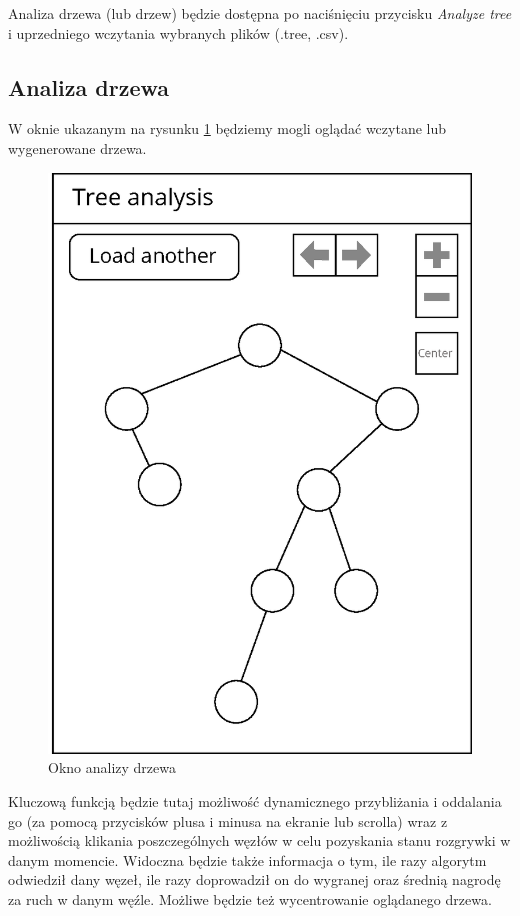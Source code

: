 \documentclass{article}
\begin{document}
	\noindent Analiza drzewa (lub drzew) będzie dostępna po naciśnięciu przycisku \textit{Analyze tree} i uprzedniego wczytania wybranych plików (.tree, .csv).
	
	\clearpage
	\subsection{Analiza drzewa}
	W oknie ukazanym na rysunku \ref{rys:analyze_tree} będziemy mogli oglądać wczytane lub wygenerowane drzewa. 
	\begin{figure}[h!]
		\centering
		\includegraphics[scale=0.8]{tree-eps-improved}
		\caption{Okno analizy drzewa}
		\label{rys:analyze_tree}
	\end{figure}
	
	\noindent Kluczową funkcją będzie tutaj możliwość dynamicznego przybliżania i oddalania go (za pomocą przycisków plusa i minusa na ekranie lub scrolla) wraz z możliwością klikania poszczególnych węzłów w celu pozyskania stanu rozgrywki w danym momencie. Widoczna będzie także informacja o tym, ile razy algorytm odwiedził dany węzeł, ile razy doprowadził on do wygranej oraz średnią nagrodę za ruch w danym węźle. Możliwe będzie też wycentrowanie oglądanego drzewa.\\
	
\end{document}
